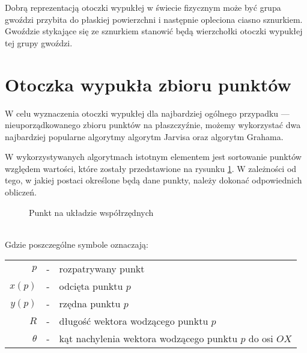     Dobrą reprezentacją otoczki wypukłej w świecie fizycznym może być grupa gwoździ przybita do płaskiej powierzchni i następnie opleciona ciasno sznurkiem. Gwoździe stykające się ze sznurkiem stanowić będą wierzchołki otoczki wypukłej tej grupy gwoździ.
        \section{Otoczka wypukła zbioru punktów}
        W celu wyznaczenia otoczki wypukłej dla najbardziej ogólnego przypadku --- nieuporządkowanego zbioru punktów na płaszczyźnie, możemy wykorzystać dwa najbardziej popularne algorytmy algorytm Jarvisa oraz algorytm Grahama.
        
        W wykorzystywanych algorytmach istotnym elementem jest sortowanie punktów względem wartości, które zostały przedstawione na rysunku \ref{fig:axis}. W zależności od tego, w jakiej postaci określone będą dane punkty, należy dokonać odpowiednich obliczeń.
        \begin{figure}[h!]
        	\begin{center}
    			
    			\caption{Punkt na układzie współrzędnych\mysrc}\label{fig:axis}
    	\end{center}
    	\end{figure}\vspace{-8 mm}\\
    	Gdzie poszczególne symbole oznaczają:\\
    	\begin{tabular}{rcl}
    	$p$ & - & rozpatrywany punkt\\
    	$x\left( p \right)$ & - & odcięta punktu $p$\\
    	$y\left( p \right)$ & - & rzędna punktu $p$\\
    	$R$ & - & długość wektora wodzącego punktu $p$\\
    	$\theta$ & - & kąt nachylenia wektora wodzącego punktu $p$ do osi $OX$
    	\end{tabular}\\
    	
